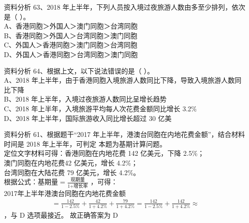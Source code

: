 \documentclass[aspectratio=169]{beamer}
\begin{document}
  \begin{frame}[t]{资料分析}
      63、2018 年上半年，下列人员按入境过夜旅游人数由多至少排列，依次是（ ）。 \\
      A、香港同胞＞外国人＞澳门同胞＞台湾同胞                                  \\
      B、香港同胞＞外国人＞台湾同胞＞澳门同胞                                  \\
      C、外国人＞香港同胞＞澳门同胞＞台湾同胞                                  \\
      D、外国人＞香港同胞＞台湾同胞＞澳门同胞                                  \\
  \end{frame}                           


  \begin{frame}[t]{资料分析}
      64、根据上文，以下说法错误的是（ ）。                                         \\
      A、2018 年上半年，由于香港同胞入境旅游人数同比下降，导致入境旅游人数同比下降  \\
      B、2018 年上半年，入境过夜旅游人数同比呈增长趋势                              \\
      C、2018 年上半年，入境旅游平均每人次花费金额同比增长 3.2\%                    \\
      D、2018 年上半年，国际旅游收入同比增长超过 30 亿美                            \\
  \end{frame}                           



  \begin{frame}[t]{资料分析}
      61、根据题干“2017 年上半年，港澳台同胞在内地花费金额”，结合材料时间是 2018 年上半年，可判定
      本题为基期计算问题。\\
      定位文字材料可得：香港同胞在内地花费 142 亿美元，下降 2.5\%；\\
      澳门同胞在内地花费42 亿美元，增长 4.2\%；\\
      台湾同胞在大陆花费 79 亿美元，增长 4.2\%。\\
      根据公式：$\text{基期量} = \frac{\text{现期量}}{\text{1+增长率}}$ ，可得：\\
      2017年上半年港澳台同胞在内地花费金额
      \begin{gather}
          = \frac{142}{1-2.5\%} + \frac{42}{1+4.2\%} + \frac{79}{1+4.2\%} 
          = \frac{142}{1-2.5\%} + \frac{142}{1+4.2\%} 
          \approx 
      \end{gather}
      ，与 D 选项最接近。
      故正确答案为 D
  \end{frame}                           
\end{document}
